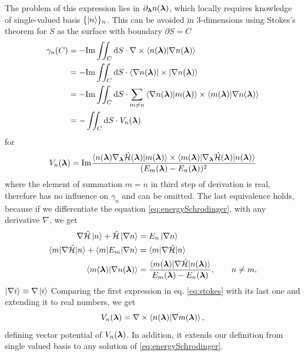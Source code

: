 The problem of this expression lies in $\partial_{\bm\lambda} n({\bm\lambda})$, which locally requires knowledge of single-valued basis $\{\ket{n}\}_n$. This can be avoided in 3-dimensions using Stokes's theorem for $S$ as the surface with boundary $\partial S=C$
\begin{equation}
    \begin{split}
        \gamma_n(C) &= -\textrm{Im} \iint_C \mathrm{d} S \cdot \nabla \times \braket{n({\bm\lambda})|\nabla n({\bm\lambda})}\\
         &= -\textrm{Im} \iint_C \mathrm{d} S \cdot \braket{\nabla n({\bm\lambda})|\times|\nabla n({\bm\lambda})}\\
        &= -\textrm{Im} \iint_C \mathrm{d} S \cdot \sum_{m\neq n} \braket{\nabla n({\bm\lambda})|m({\bm\lambda})}\times \braket{m({\bm\lambda})|\nabla n({\bm\lambda})}\\
        &= -\iint_C \mathrm{d} S \cdot V_n({\bm\lambda})
            \label{eq:stokes}
    \end{split}
\end{equation}
for 
\begin{equation}
    V_n({\bm\lambda}) = \textrm{Im} \frac{
            \braket{n({\bm\lambda})\nabla_{\bm\lambda} \hat{\mathcal{H}}({\bm\lambda}) |m({\bm\lambda})}\times \braket{m({\bm\lambda})|\nabla_{\bm\lambda} \hat{\mathcal{H}}({\bm\lambda})|n({\bm\lambda})}    
             }{
(E_m({\bm\lambda})-E_n({\bm\lambda}))^2
            }
\end{equation}
where the element of summation $m=n$ in third step of derivation is real, therefore has no influence on $\gamma_n$ and can be omitted. The last equivalence holds, because if we differentiate the \Schrodinger equation \ref{eq:energySchrodinger},  with any derivative $\nabla$, we get 
\begin{equation}
    \begin{split}
        \nabla \hat{\mathcal{H}}\ket{n}+\hat{\mathcal{H}} \ket{\nabla n} &= E_n\ket{\nabla n}\\
        \braket{m|\nabla \hat{\mathcal{H}}|n}+\braket{m|E_m|\nabla n} &= \braket{m|\nabla \hat{\mathcal{H}}|n}\\
        \braket{m({\bm\lambda})|\nabla n({\bm\lambda})}&=
        \frac{\braket{m({\bm\lambda})|\nabla \hat{\mathcal{H}} |n({\bm\lambda})}}
        { E_m({\bm\lambda})-E_n({\bm\lambda})}, \qquad n\neq m,
    \end{split}
\end{equation}
$\ket{\nabla i}\equiv\nabla \ket{ i}$
Comparing the first expression in eq. \ref{eq:stokes} with its last one and extending it to real numbers, we get
\begin{equation}
    V_n({\bm\lambda})=\nabla\times\braket{n({\bm\lambda})|\nabla m({\bm\lambda})}, 
    \label{eq:vectorPotentialDef}  
\end{equation}
defining vector potential of $V_n({\bm\lambda})$. In addition, it extends our definition from single valued basis to any solution of \ref{eq:energySchrodinger}.

